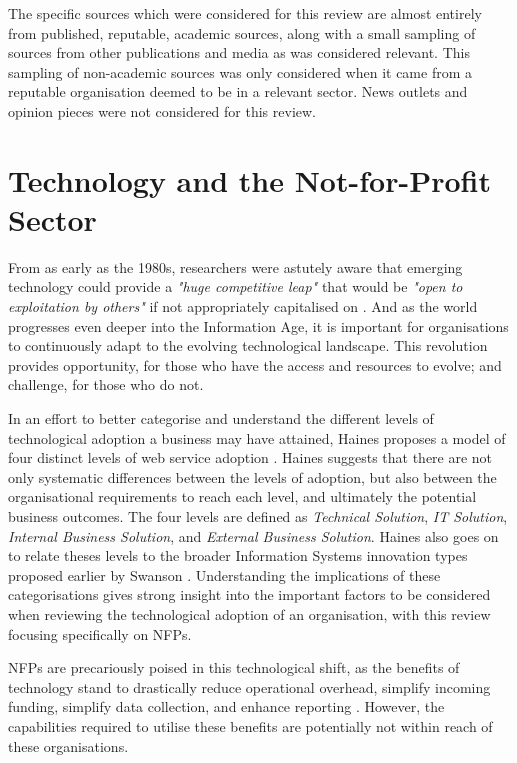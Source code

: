 The specific sources which were considered for this review are almost entirely from published, reputable, academic sources, along with a small sampling of sources from other publications and media as was considered relevant. This sampling of non-academic sources was only considered when it came from a reputable organisation deemed to be in a relevant sector. News outlets and opinion pieces were not considered for this review.

\section{Technology and the Not-for-Profit Sector}

From as early as the 1980s, researchers were astutely aware that emerging technology could provide a \emph{"huge competitive leap"} that would be \emph{"open to exploitation by others"} if not appropriately capitalised on \cite{benjamin1983information}. And as the world progresses even deeper into the Information Age, it is important for organisations to continuously adapt to the evolving technological landscape. This revolution provides opportunity, for those who have the access and resources to evolve; and challenge, for those who do not.

In an effort to better categorise and understand the different levels of technological adoption a business may have attained, Haines proposes a model of four distinct levels of web service adoption \cite{haines2003levels}. Haines suggests that there are not only systematic differences between the levels of adoption, but also between the organisational requirements to reach each level, and ultimately the potential business outcomes. The four levels are defined as \emph{Technical Solution}, \emph{IT Solution}, \emph{Internal Business Solution}, and \emph{External Business Solution}. Haines also goes on to relate theses levels to the broader Information Systems innovation types proposed earlier by Swanson \cite{swanson1994information}. Understanding the implications of these categorisations gives strong insight into the important factors to be considered when reviewing the technological adoption of an organisation, with this review focusing specifically on NFPs.

NFPs are precariously poised in this technological shift, as the benefits of technology stand to drastically reduce operational overhead, simplify incoming funding, simplify data collection, and enhance reporting \cite{boles2013technology} \cite{bopp2017disempowered}. However, the capabilities required to utilise these benefits are potentially not within reach of these organisations.

